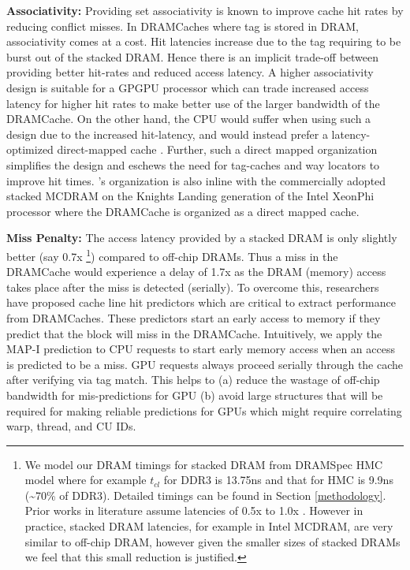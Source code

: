 \par \textbf{Associativity:} Providing set associativity is known to improve cache hit rates by reducing conflict misses. In DRAMCaches where tag is stored in DRAM,  associativity comes at a cost. Hit latencies increase due to the tag requiring to be burst out of the stacked DRAM. Hence there is an implicit trade-off between providing better hit-rates and reduced access latency. A higher associativity design is suitable for a GPGPU processor which can trade increased access latency for higher hit rates to make better use of the larger bandwidth of the DRAMCache. On the other hand, the CPU would suffer when using such a design due to the increased hit-latency, and  would instead prefer a latency-optimized direct-mapped cache \cite{alloy}.
Further, such a direct mapped organization simplifies the design and eschews the need for tag-caches \cite{atcache} and way locators \cite{bimodal} to improve hit times. \cachename's organization is also inline with the commercially adopted stacked MCDRAM on the Knights Landing generation of the Intel XeonPhi processor \cite{xeonphi} where the DRAMCache is organized as a direct mapped cache.

\par \textbf{Miss Penalty:} The access latency provided by a stacked DRAM is only slightly better (say 0.7x
\footnote{We model our DRAM timings for stacked DRAM from DRAMSpec\cite{dramspec} HMC model where for example $t_{cl}$ for DDR3 is 13.75ns and that for HMC is 9.9ns (\textasciitilde70\% of DDR3). Detailed timings can be found in Section \ref{methodology}. Prior works in literature assume latencies of 0.5x \cite{alloy} to 1.0x \cite{mainak-hpca}. However in practice, stacked DRAM latencies, for example in Intel MCDRAM\cite{xeonphi}, are very similar to off-chip DRAM, however given the smaller sizes of stacked DRAMs we feel that this small reduction is justified.}) compared to off-chip DRAMs. Thus a miss in the DRAMCache would experience a delay of 1.7x as the DRAM (memory) access takes place after the miss is detected (serially). To overcome this, researchers have proposed cache line hit predictors \cite{loh-hill,alloy} which are critical to extract performance from DRAMCaches. These predictors start an early access to memory if they predict that the block will miss in the DRAMCache. Intuitively, we apply the MAP-I prediction \cite{alloy} to CPU requests to start early memory access when an access is predicted to be a miss. GPU requests always proceed serially through the cache after verifying via tag match. This helps to (a) reduce the wastage of off-chip bandwidth for mis-predictions for GPU (b) avoid large structures that will be required for making reliable predictions for GPUs which might require correlating warp, thread, and CU IDs.

